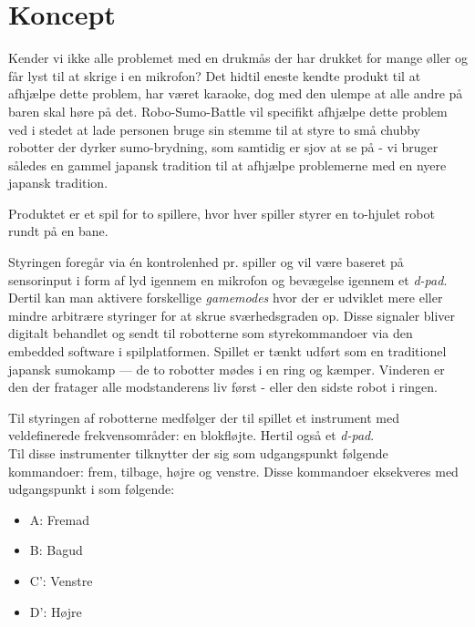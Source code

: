 \section{Koncept}
 Kender vi ikke alle problemet med en drukmås der har drukket for mange øller og får lyst til at skrige i en mikrofon? Det hidtil eneste kendte produkt til at afhjælpe dette problem, har været karaoke, dog med den ulempe at alle andre på baren skal høre på det. Robo-Sumo-Battle vil specifikt afhjælpe dette problem ved i stedet at lade personen bruge sin stemme til at styre to små chubby robotter der dyrker sumo-brydning, som samtidig er sjov at se på - vi bruger således en gammel japansk tradition til at afhjælpe problemerne med en nyere japansk tradition. 

Produktet er et spil for to spillere, hvor hver spiller styrer en to-hjulet robot rundt på en bane.



Styringen foregår via én kontrolenhed pr. spiller og vil være baseret på sensorinput i form af lyd igennem en mikrofon og bevægelse igennem et \textit{d-pad}. Dertil kan man aktivere forskellige \textit{gamemodes} hvor der er udviklet mere eller mindre arbitrære styringer for at skrue sværhedsgraden op. 
Disse signaler bliver digitalt behandlet og sendt til robotterne som styrekommandoer via den embedded software i spilplatformen.
Spillet er tænkt udført som en traditionel japansk sumokamp --- de to robotter mødes i en ring og kæmper. Vinderen er den der fratager alle modstanderens liv først - eller den sidste robot i ringen.



Til styringen af robotterne medfølger der til spillet et instrument med veldefinerede frekvensområder: en blokfløjte. Hertil også et \textit{d-pad}.
\\
 Til disse instrumenter tilknytter der sig som udgangspunkt følgende kommandoer: frem, tilbage, højre og venstre. Disse kommandoer eksekveres med udgangspunkt i  som følgende: 
\begin{itemize}
    \item A: Fremad
    \item B: Bagud
    \item C': Venstre 
    \item D': Højre
\end{itemize}




